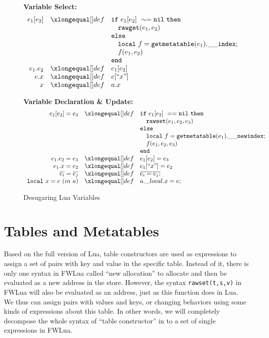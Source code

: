 \begin{figure}
\caption{Desugaring Lua Variables}\label{fig:desLuaVar}
{\bf Variable Select:}\[
\begin{array}{rclcl}
\desugar{e_1[e_2]}{{\tt if}~ e_1[e_2] ~\sim= {\tt nil} ~ {\tt then}\\}
\desugarline{ 
     \quad{\tt rawget}(e_1, e_2) ~\\
     {\tt else}\\
     \quad{\tt local}~f = {\tt getmetatable}(e_1).{\tt{\_}{\_}index};\\
     \quad f(e_1,e_2)\\ 
     {\tt end}
     }
\desugar{e_1.e_2}{e_1[e_2]}
\desugar{e.x}{e[``x"]}
\desugar{x}{a.x} %
\end{array}\]

{\bf Variable Declaration \& Update:}\[
\begin{array}{rclcl}
\desugar{e_1[e_2]=e_3}{
    {\tt if}~ e_1[e_2] ~== {\tt nil} ~ {\tt then}\\
}
\desugarline{  
     \quad{\tt rawset}(e_1, e_2,e_3) ~\\
     {\tt else}\\
     \quad{\tt local}~f = {\tt getmetatable}(e_1).{\tt{\_}{\_}newindex};\\
     \quad f(e_1,e_2,e_3)\\ 
     {\tt end}\\
}
\desugar{e_1.e_2=e_3}{e_1[e_2] = e_3} %
\desugar{e_1.x=e_2}{e_1[``x"] = e_2}
\desugar{\overline{e_i}=\overline{e_j}}{\overline{e_i = e_j;}} %
\desugar{{\tt local}~x=e~(in~a)}{a.\_local.x = e;} %

\end{array}\]
\end{figure}

\section{Tables and Metatables}\label{sec:TranslateTabls}
Based on the full version of Lua, table constructors are used as expressions to assign a set of pairs with key and value in the specific table. Instead of it, there is only one syntax in FWLua called ``new allocation'' to allocate and then be evaluated as a new address in the store. 
However, the syntax {\tt rawset(t,s,v)} in FWLua will also be evaluated as an address, just as this function does in Lua.  We thus can assign pairs with values and keys, or changing behaviors using some kinds of expressions about this table. In other words, we will completely decompose the whole syntax of ``table constructor'' in to a set of single expressions in FWLua. 

